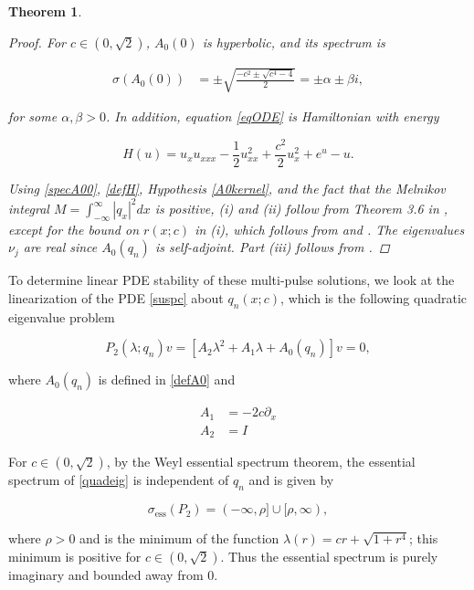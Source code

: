 \documentclass[12pt]{article}
\newtheorem{theorem}{Theorem}
\begin{document}
\begin{theorem}
\begin{proof}
For $c \in (0, \sqrt{2})$, $A_0(0)$ is hyperbolic, and its spectrum is

\begin{align}\label{specA00}
\sigma(A_0(0)) &= \pm \sqrt{\frac{-c^2 \pm \sqrt{c^4 - 4}}{2} } = \pm \alpha \pm \beta i,
\end{align}

for some $\alpha, \beta > 0$. In addition, equation \eqref{eqODE} is Hamiltonian with energy

\begin{equation}\label{defH}
H(u) = u_x u_{xxx} - \frac{1}{2}u_{xx}^2 + \frac{c^2}{2}u_x^2 + e^u - u.
\end{equation}

Using \eqref{specA00}, \eqref{defH}, Hypothesis \ref{A0kernel}, and the fact that the Melnikov integral $M = \int_{-\infty}^\infty |q_x|^2 dx$ is positive, (i) and (ii) follow from Theorem 3.6 in \cite{Sandstede1997}, except for the bound on $r(x; c)$ in (i), which follows from \cite{Sanstede1993} and \cite{Sandstede1998}. The eigenvalues $\nu_j$ are real since $A_0(q_n)$ is self-adjoint. Part (iii) follows from \cite{Sandstede1998}.
\end{proof}
\end{theorem}

To determine linear PDE stability of these multi-pulse solutions, we look at the linearization of the PDE \eqref{suspc} about $q_n(x; c)$, which is the following quadratic eigenvalue problem

\begin{equation}\label{quadeig}
P_2(\lambda; q_n)v =  [A_2 \lambda^2 + A_1 \lambda + A_0(q_n)]v = 0,
\end{equation}

where $A_0(q_n)$ is defined in \eqref{defA0} and 

\begin{align}
A_1 &= -2 c \partial_x \\
A_2 &= I
\end{align}

For $c \in (0, \sqrt{2})$, by the Weyl essential spectrum theorem, the essential spectrum of \eqref{quadeig} is independent of $q_n$ and is given by

\begin{equation}\label{quadess}
\sigma_{\text{ess}}(P_2) = (-\infty, \rho] \cup [\rho, \infty),
\end{equation}

where $\rho > 0$ and is the minimum of the function $\lambda(r) = c r + \sqrt{1 + r^4}$; this minimum is positive for $c \in (0, \sqrt{2})$. Thus the essential spectrum is purely imaginary and bounded away from 0.\\
\end{document}
